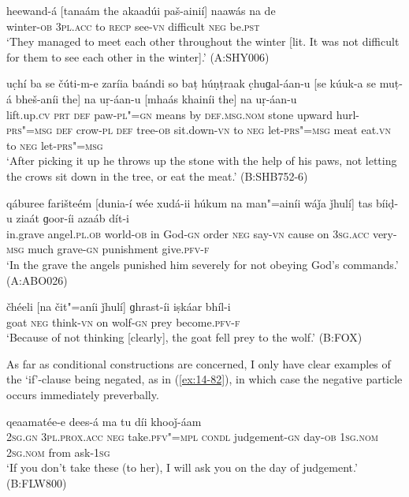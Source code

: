 \begin{exe}
\ex
\label{ex:14-78}
\gll heewand-á [tanaám the akaadúi paš-ainií] naawás  na de \\
winter-\textsc{ob} \textsc{3pl.acc} to \textsc{recp} see-\textsc{vn} difficult \textsc{neg}
be.\textsc{pst} \\
\glt `They managed to meet each other throughout the winter [lit. It was not difficult for them to see each other in the winter].' (A:SHY006)

\ex
\label{ex:14-79}
\gll uc̣hí ba se čúti-m-e zaríia baándi  so baṭ húṇṭraak c̣huɡal-áan-u  [se kúuk-a se muṭ-á bheš-aníi the] na uṛ-áan-u \textsc{[}mhaás khainíi the] na uṛ-áan-u \\
lift.up.\textsc{cv} \textsc{prt} \textsc{def} paw-\textsc{pl"=gn} means by  \textsc{def.msg.nom} stone upward hurl-\textsc{prs"=msg}  \textsc{def} crow-\textsc{pl} \textsc{def} tree-\textsc{ob} sit.down-\textsc{vn} to \textsc{neg} let-\textsc{prs"=msg} meat eat.\textsc{vn} to \textsc{neg} let-\textsc{prs"=msg} \\
\glt `After picking it up he throws up the stone with the help of his paws, not letting the crows sit down in the tree, or eat the meat.' (B:SHB752-6)

\ex
\label{ex:14-80}
\gll qáburee farišteém [dunia-í wée xudá-ii húkum na  man"=ainíi wáǰa
  ǰhulí] tas bíiḍ-u ziaát  ɡoor-íi azaáb dít-i \\
in.grave angel.\textsc{pl.ob} world-\textsc{ob} in God-\textsc{gn} order \textsc{neg}  say-\textsc{vn} cause on \textsc{3sg.acc} very-\textsc{msg} much grave-\textsc{gn} punishment give.\textsc{pfv-f}  \\
\glt `In the grave the angels punished him severely for not obeying God's commands.' (A:ABO026)

\ex
\label{ex:14-81}
\gll čhéeli [na čit"=aníi ǰhulí] ɡhrast-íi iṣkáar bhíl-i \\
goat \textsc{neg} think-\textsc{vn} on wolf-\textsc{gn} prey become.\textsc{pfv-f} \\
\glt `Because of not thinking [clearly], the goat fell prey to the wolf.' (B:FOX)
\end{exe}

As far as conditional constructions are concerned, I only have clear examples of the `if'-clause being negated, as in (\ref{ex:14-82}), in which case the negative particle occurs immediately preverbally.

\begin{exe}
\ex
\label{ex:14-82}
  qeaamatée-e dees-á ma tu díi khooǰ-áam \\
\textsc{2sg.gn} \textsc{3pl.prox.acc} \textsc{neg} take.\textsc{pfv"=mpl} \textsc{condl}  judgement-\textsc{gn} day-\textsc{ob} \textsc{1sg.nom} \textsc{2sg.nom} from ask-\textsc{1sg}  \\
\glt `If you don't take these (to her), I will ask you on the day of judgement.' (B:FLW800)
\end{exe}

